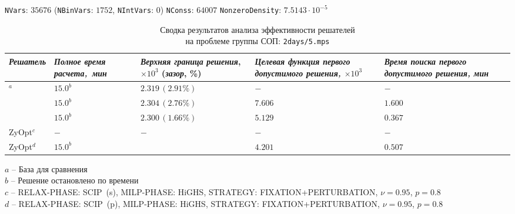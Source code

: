\documentclass[%
	11pt,
	a4paper,
	utf8,
		]{article}
\begin{document}
{
	\begin{table}[!h]
		\centering
		\caption{Сводка результатов анализа эффективности решателей\\ на проблеме группы СОП: \texttt{2days/5.mps}} 
		
		{\footnotesize \texttt{NVars}: $ 35676 $ (\texttt{NBinVars}: $ 1752 $,  \texttt{NIntVars}: $ 0 $) \texttt{NConss}: $ 64007 $ \texttt{NonzeroDensity}: $ 7.5143 \cdot 10^{-5} $}\\[2mm]
		
		\begin{tabular}{ p{2.9cm} | p{2.5cm} p{3.4cm} p{3.75cm} p{3.6cm} p{3.2cm} }
			\rowcolor{black!5}\emph{Решатель} & \emph{Полное время \mbox{расчета, мин}} & \emph{Верхняя граница} \mbox{\itshape решения}, $ \times 10^{3} $ (\emph{зазор}, \%) & \emph{Целевая функция первого допустимого решения, $ \times 10^3 $} & \emph{Время поиска первого допустимого решения, мин} \\
			\hline
			\rowcolor{blue!3}{CPLEX 12.8.0.0}$ ^a $ & $ 15.0^b $ & $ 2.319 \, (2.91\%) $ & $ - $ & $ - $ \\
			\rowcolor{black!5}{SCIP 8.0.3} & $ 15.0^b $ & $ 2.304 \, (2.76\%) $ & $ 7.606 $ & $ 1.600 $ \\
			\rowcolor{blue!3}{HiGHS 1.5.3} & $ 15.0^b $ & $ 2.300 \, (1.66\%) $ & $ 5.129 $ & $ 0.367 $ \\
			\rowcolor{black!5}ZyOpt$^c $ & {$ - $}  & $ - $ & $ - $ & $ - $ \\
			\rowcolor{blue!3}ZyOpt$^d $ & {$ 15.0^b $}  & \ccb{$ 2.351 \, (4.35\%) (-1.4\%) $} & $ 4.201 $ & $ 0.507 $ 
		\end{tabular}
	\end{table}
	\vspace*{-3mm}
	\hspace*{3mm}$ a $ -- {\footnotesize База для сравнения}\\[-7mm]
	
	\hspace*{3mm}$ b $ -- {\footnotesize Решение остановлено по времени}\\[-7mm]
	
	\hspace*{3mm}$ c $ -- {\footnotesize RELAX-PHASE: SCIP~(s), MILP-PHASE: HiGHS, STRATEGY: FIXATION+PERTURBATION, $ \nu = 0.95 $, $ p = 0.8 $}\\[-7mm]
	
	\hspace*{3mm}$ d $ -- {\footnotesize RELAX-PHASE: SCIP~(p), MILP-PHASE: HiGHS, STRATEGY: FIXATION+PERTURBATION, $ \nu = 0.95 $, $ p = 0.8 $}\\[-7mm]
}
\end{document}
